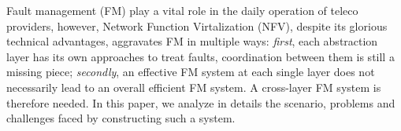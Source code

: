 Fault management (FM) play a vital role in the daily operation of teleco
providers, however, Network Function Virtalization (NFV), despite its glorious
technical advantages, aggravates FM in multiple ways: \textit{first}, each
abstraction layer has its own approaches to treat faults, coordination between
them is still a missing piece; \textit{secondly}, an effective FM system at each
single layer does not necessarily lead to an overall efficient FM system. A
cross-layer FM system is therefore needed. In this paper, we analyze in details
the scenario, problems and challenges faced by constructing such a system.        

